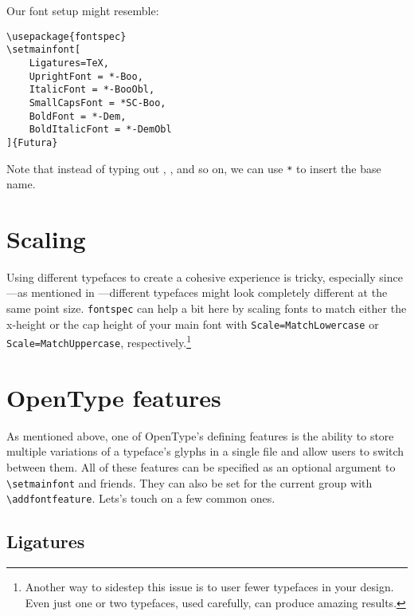 \newpage
\noindent Our font setup might resemble:
\begin{leftfigure}
\begin{lstlisting}
\usepackage{fontspec}
\setmainfont[
    Ligatures=TeX,
    UprightFont = *-Boo,
    ItalicFont = *-BooObl,
    SmallCapsFont = *SC-Boo,
    BoldFont = *-Dem,
    BoldItalicFont = *-DemObl
]{Futura}
\end{lstlisting}
\end{leftfigure}
Note that instead of typing out ,
, and so on, we can use \texttt{*} to insert the base name.

\section{Scaling}

Using different typefaces to create a cohesive experience is tricky,
especially since---as mentioned in ---different typefaces
might look completely different at the same point size.
\texttt{fontspec} can help a bit here by scaling fonts to match either the
x-height or the cap height of your main font with
\verb|Scale=MatchLowercase| or \verb|Scale=MatchUppercase|,
respectively.\footnote{Another way to sidestep this issue is to user fewer
typefaces in your design. Even just one or two typefaces,
used carefully, can produce amazing results.}


\section{OpenType features}

As mentioned above, one of OpenType's defining features is the ability to store
multiple variations of a typeface's glyphs in a single file and allow users
to switch between them.
All of these features can be specified as an optional argument to
\verb|\setmainfont| and friends.
They can also be set for the current group with
\verb|\addfontfeature|.
Lets's touch on a few common ones.

\subsection{Ligatures}

